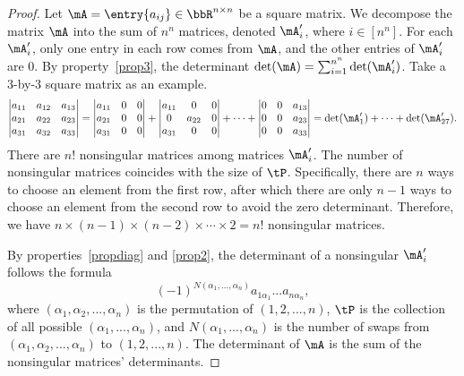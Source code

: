 \documentclass[11pt]{article}
\theoremstyle{plain}
\theoremstyle{definition}
\begin{document}
\begin{proof}
	Let $\mA = \entry{a_{ij}} \in \bbR^{n \times n}$ be a square matrix. We decompose the  matrix $\mA$ into the sum of $n^n$ matrices, denoted $\mA'_i$, where $i \in [n^n]$. For each $\mA'_i$, only one entry in each row comes from $\mA$, and the other entries of $\mA'_i $ are 0. By property~\ref{prop3}, the determinant $\det(\mA) = \sum_{i=1}^{n^n} \det(\mA'_i)$. Take a 3-by-3 square matrix as an example.
	\begin{align}
		\begin{vmatrix}
			a_{11} & a_{12} & a_{13}\\
			a_{21} & a_{22} & a_{23}\\
			a_{31} & a_{32} & a_{33}
		\end{vmatrix} = \begin{vmatrix}
			a_{11} & 0& 0\\
			a_{21} & 0 & 0\\
			a_{31} &0 & 0
		\end{vmatrix} + \begin{vmatrix}
			a_{11} & 0& 0\\
			0 & a_{22} & 0\\
			a_{31} &0 & 0
		\end{vmatrix} + \cdots +\begin{vmatrix}
			0 & 0& a_{13}\\
			0& 0 & a_{23}\\
			 0&0 & a_{33}
		\end{vmatrix} = \det(\mA'_1)  +\cdots + \det(\mA'_{27}).
	\end{align}
	There are $n!$ nonsingular matrices among matrices $\mA'_i$. The number of nonsingular matrices coincides with the size of $\tP$. Specifically, there are $n$ ways to choose an element from the first row, after which there are only $n-1$ ways to choose an element from the second row to avoid the zero determinant. Therefore, we have $n \times (n-1) \times (n-2) \times \cdots \times 2 = n!$ nonsingular matrices.
	
	By properties~\ref{propdiag} and \ref{prop2}, the determinant of a nonsingular $\mA'_i$ follows the formula \[(-1)^{N(\alpha_1,...,\alpha_n)}  a_{1\alpha_1} ... a_{n \alpha_n},\]
	where $(\alpha_1, \alpha_2, ...,\alpha_n)$ is the permutation of $(1,2,...,n)$, $\tP$ is the collection of all possible  $(\alpha_1,...,\alpha_n)$, and $N(\alpha_1,...,\alpha_n)$ is the number of swaps from $(\alpha_1,\alpha_2,...,\alpha_n)$  to $(1,2,...,n)$. The determinant of $\mA$ is the sum of the nonsingular matrices' determinants.
\end{proof}
\end{document}
